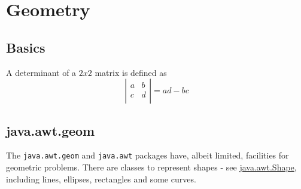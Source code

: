 \chapter{Geometry}

\section{Basics}

A determinant of a $2x2$ matrix is defined as
\[
    \left\vert
        \begin{array}{cc}
            a & b \\
            c & d \\
        \end{array}
    \right\vert
    = a d - b c
\]

\section{java.awt.geom}

The \texttt{java.awt.geom} and \texttt{java.awt} packages have, albeit limited, facilities
for geometric problems.  There are classes to represent shapes - see
\href{http://docs.oracle.com/javase/6/docs/api/java/awt/Shape.html}{java.awt.Shape}, including
lines, ellipses, rectangles and some curves.

